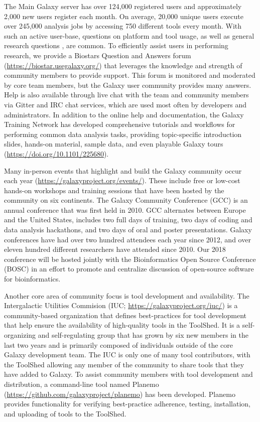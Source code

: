 The Main Galaxy server has over 124,000 registered users and approximately 2,000 new users register each month. On average, 20,000 unique users execute over 245,000 analysis jobs by accessing 750 different tools every month. With such an active user-base, questions on platform and tool usage, as well as general research questions \cite{blankenberg2015online}, are common. To efficiently assist users in performing research, we provide a Biostars \cite{parnell2011biostar} Question and Answers forum (\url{https://biostar.usegalaxy.org/}) that leverages the knowledge and strength of community members to provide support. This forum is monitored and moderated by core team members, but the Galaxy user community provides many answers. Help is also available through live chat with the team and community members via Gitter and IRC chat services, which are used most often by developers and administrators. In addition to the online help and documentation, the Galaxy Training Network has developed comprehensive tutorials and workflows for performing common data analysis tasks, providing topic-specific introduction slides, hands-on material, sample data, and even playable Galaxy tours (\url{https://doi.org/10.1101/225680}).

Many in-person events that highlight and build the Galaxy community occur each year (\url{https://galaxyproject.org/events/}). These include free or low-cost hands-on workshops and training sessions that have been hosted by the community on six continents. The Galaxy Community Conference (GCC) is an annual conference that was first held in 2010. GCC alternates between Europe and the United States, includes two full days of training, two days of coding and data analysis hackathons, and two days of oral and poster presentations. Galaxy conferences have had over two hundred attendees each year since 2012, and over eleven hundred different researchers have attended since 2010. Our 2018 conference will be hosted jointly with the Bioinformatics Open Source Conference (BOSC) in an effort to promote and centralize discussion of open-source software for bioinformatics.

Another core area of community focus is tool development and availability. The Intergalactic Utilities Commision (IUC; \url{https://galaxyproject.org/iuc/}) is a community-based organization that defines best-practices for tool development that help ensure the availability of high-quality tools in the ToolShed. It is a self-organizing and self-regulating group that has grown by six new members in the last two years and is primarily composed of individuals outside of the core Galaxy development team. The IUC is only one of many tool contributors, with the ToolShed allowing any member of the community to share tools that they have added to Galaxy. To assist community members with tool development and distribution, a command-line tool named Planemo (\url{https://github.com/galaxyproject/planemo}) has been developed. Planemo provides functionality for verifying best-practice adherence, testing, installation, and uploading of tools to the ToolShed.

